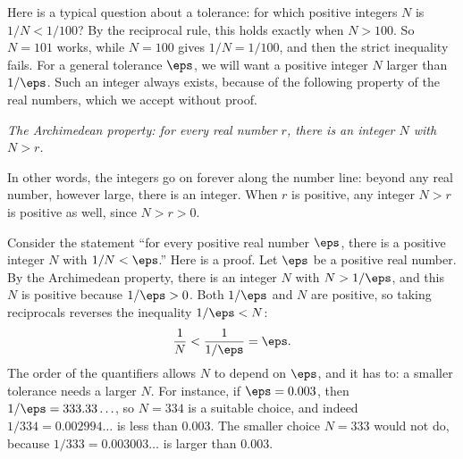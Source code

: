 Here is a typical question about a tolerance: for which positive integers $N$ is $1/N<1/100$? By the reciprocal rule, this holds exactly when $N>100$. So $N=101$ works, while $N=100$ gives $1/N=1/100$, and then the strict inequality fails. For a general tolerance $\eps$, we will want a positive integer $N$ larger than $1/\eps$. Such an integer always exists, because of the following property of the real numbers, which we accept without proof.
\begin{center}
\emph{The Archimedean property: for every real number $r$, there is an integer $N$ with $N>r$.}
\end{center}
In other words, the integers go on forever along the number line: beyond any real number, however large, there is an integer. When $r$ is positive, any integer $N>r$ is positive as well, since $N>r>0$.

\begin{example}\label{ch02:ex:archimedes}
Consider the statement ``for every positive real number $\eps$, there is a positive integer $N$ with $1/N<\eps$.'' Here is a proof. Let $\eps$ be a positive real number. By the Archimedean property, there is an integer $N$ with $N>1/\eps$, and this $N$ is positive because $1/\eps>0$. Both $1/\eps$ and $N$ are positive, so taking reciprocals reverses the inequality $1/\eps<N$:
\[
\frac1N<\frac{1}{1/\eps}=\eps.
\]
The order of the quantifiers allows $N$ to depend on $\eps$, and it has to: a smaller tolerance needs a larger $N$. For instance, if $\eps=0.003$, then $1/\eps=333.33\ldots$, so $N=334$ is a suitable choice, and indeed $1/334=0.002994\ldots$ is less than $0.003$. The smaller choice $N=333$ would not do, because $1/333=0.003003\ldots$ is larger than $0.003$.
\end{example}


